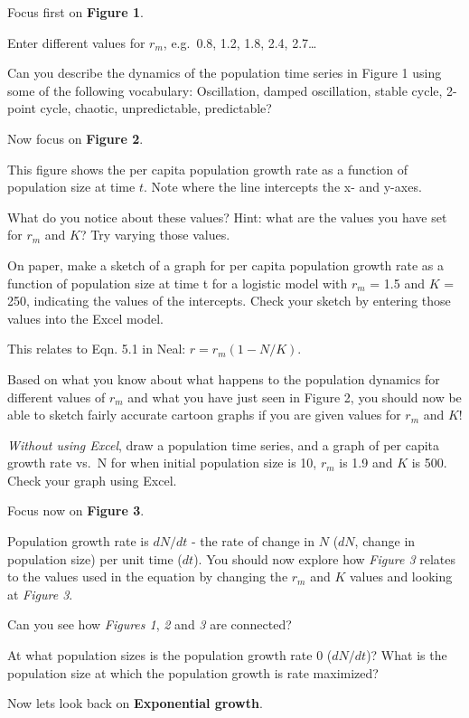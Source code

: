 \documentclass[
  a4paper]{book}
\begin{document}
Focus first on \textbf{Figure 1}.

Enter different values for \(r_m\), e.g.~0.8, 1.2, 1.8, 2.4, 2.7\ldots{}

Can you describe the dynamics of the population time series in Figure 1 using some of the following vocabulary: Oscillation, damped oscillation, stable cycle, 2-point cycle, chaotic, unpredictable, predictable?

Now focus on \textbf{Figure 2}.

This figure shows the per capita population growth rate as a function of population size at time \(t\). Note where the line intercepts the x- and y-axes.

What do you notice about these values? Hint: what are the values you have set for \(r_m\) and \(K\)? Try varying those values.

On paper, make a sketch of a graph for per capita population growth rate as a function of population size at time t for a logistic model with \(r_m\) = 1.5 and \(K\) = 250, indicating the values of the intercepts. Check your sketch by entering those values into the Excel model.

This relates to Eqn. 5.1 in Neal: \(r = r_m(1-N/K)\).

Based on what you know about what happens to the population dynamics for different values of \(r_m\) and what you have just seen in Figure 2, you should now be able to sketch fairly accurate cartoon graphs if you are given values for \(r_m\) and \(K\)!

\emph{Without using Excel}, draw a population time series, and a graph of per capita growth rate vs.~N for when initial population size is 10, \(r_m\) is 1.9 and \(K\) is 500. Check your graph using Excel.

Focus now on \textbf{Figure 3}.

Population growth rate is \(dN/dt\) - the rate of change in \(N\) (\(dN\), change in population size) per unit time (\(dt\)). You should now explore how \emph{Figure 3} relates to the values used in the equation by changing the \(r_m\) and \(K\) values and looking at \emph{Figure 3}.

Can you see how \emph{Figures 1}, \emph{2} and \emph{3} are connected?

At what population sizes is the population growth rate 0 (\(dN/dt\))?
What is the population size at which the population growth is rate maximized?

Now lets look back on \textbf{Exponential growth}.
\end{document}
